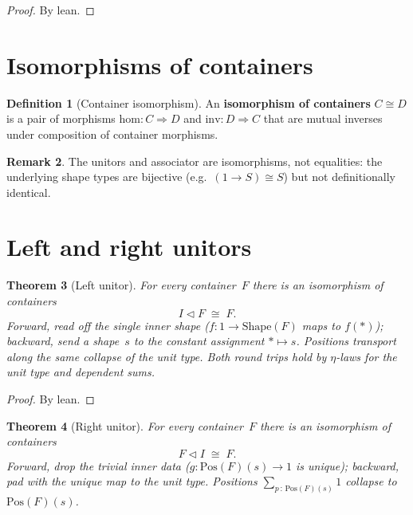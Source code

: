 \documentclass[11pt,a4paper]{article}
\theoremstyle{plain}
\newtheorem{theorem}{Theorem}[section]
\theoremstyle{definition}
\newtheorem{definition}[theorem]{Definition}
\newtheorem{remark}[theorem]{Remark}
\newcommand{\Shape}{\mathrm{Shape}}
\newcommand{\Pos}{\mathrm{Pos}}
\newcommand{\seqop}{\mathbin{\triangleleft}}
\begin{document}
\begin{proof}
By lean.
\end{proof}

\section{Isomorphisms of containers}

\begin{definition}[Container isomorphism]\label{def:iso}
An \textbf{isomorphism of containers} $C \cong D$ is a pair of
morphisms $\mathrm{hom} : C \Rightarrow D$ and
$\mathrm{inv} : D \Rightarrow C$ that are mutual inverses under
composition of container morphisms.
\end{definition}

\begin{remark}
The unitors and associator are isomorphisms, not equalities: the
underlying shape types are bijective (e.g.\ $(1 \to S) \cong S$) but not
definitionally identical.
\end{remark}

\section{Left and right unitors}

\begin{theorem}[Left unitor]\label{thm:left-unitor}
For every container~$F$ there is an isomorphism of containers
\begin{equation}
  I \seqop F \;\cong\; F.
\end{equation}
Forward, read off the single inner shape
($f : 1 \to \Shape(F)$ maps to $f(\ast)$); backward, send a shape~$s$ to
the constant assignment ${\ast} \mapsto s$. Positions transport along the
same collapse of the unit type. Both round trips hold by $\eta$-laws for
the unit type and dependent sums.
\end{theorem}

\begin{proof}
By lean.
\end{proof}

\begin{theorem}[Right unitor]\label{thm:right-unitor}
For every container~$F$ there is an isomorphism of containers
\begin{equation}
  F \seqop I \;\cong\; F.
\end{equation}
Forward, drop the trivial inner data
($g : \Pos(F)(s) \to 1$ is unique); backward, pad with the unique map
to the unit type. Positions
$\sum_{p \,:\, \Pos(F)(s)} 1$ collapse to $\Pos(F)(s)$.
\end{theorem}
\end{document}
